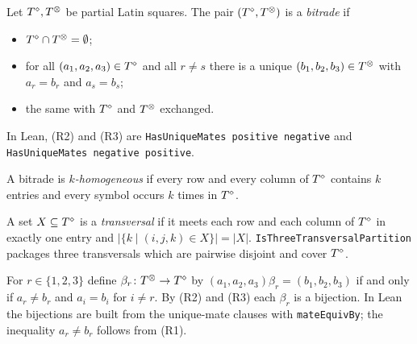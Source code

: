 \begin{definition}\label{def:bitrade}
  \leanok
  Let $T^{\diamond}, T^{\otimes}$ be partial Latin squares. The pair $(T^{\diamond}, T^{\otimes})$
  is a \emph{bitrade} if
  \begin{itemize}
    \item[(R1)] $T^{\diamond} \cap T^{\otimes} = \emptyset$;
    \item[(R2)] for all $(a_1, a_2, a_3) \in T^{\diamond}$ and all $r \neq s$ there is
      a unique $(b_1, b_2, b_3) \in T^{\otimes}$ with $a_r = b_r$ and $a_s = b_s$;
    \item[(R3)] the same with $T^{\diamond}$ and $T^{\otimes}$ exchanged.
  \end{itemize}
  In Lean, (R2) and (R3) are \texttt{HasUniqueMates positive negative} and
  \texttt{HasUniqueMates negative positive}.
\end{definition}

\begin{definition}[$k$-homogeneous]\label{def:homogeneous}
  \leanok
  A bitrade is \emph{$k$-homogeneous} if every row and every column of
  $T^{\diamond}$ contains $k$ entries and every symbol occurs $k$ times in $T^{\diamond}$.
\end{definition}

\begin{definition}[Transversal]\label{def:transversal}
  \leanok
  A set $X \subseteq T^{\diamond}$ is a \emph{transversal} if it meets each row and
  each column of $T^{\diamond}$ in exactly one entry and
  $\lvert \{ k \mid (i, j, k) \in X \} \rvert = \lvert X \rvert$.
  \texttt{IsThreeTransversalPartition} packages three transversals which
  are pairwise disjoint and cover $T^{\diamond}$.
\end{definition}

\begin{definition}\label{def:beta}
  \leanok
  For $r \in \{1, 2, 3\}$ define $\beta_r \colon T^{\otimes} \to T^{\diamond}$ by
  $(a_1, a_2, a_3)\beta_r = (b_1, b_2, b_3)$ if and only if $a_r \neq b_r$
  and $a_i = b_i$ for $i \neq r$. By (R2) and (R3) each $\beta_r$ is a
  bijection. In Lean the bijections are built from the unique-mate clauses
  with \texttt{mateEquivBy}; the inequality $a_r \neq b_r$ follows from (R1).
\end{definition}

